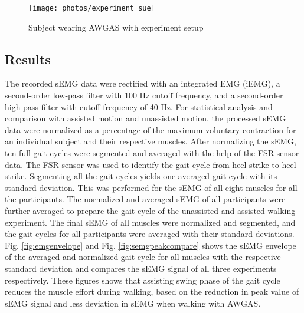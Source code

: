 \documentclass[paper,JRM,paper]{jaciiiarticle}
\begin{document}
\begin{figure}[h]
	\centering
	\texttt{[image: photos/experiment\_sue]}
	\caption{Subject wearing AWGAS with experiment setup}
	\label{fig:experiment}
\end{figure}

\subsection{Results}
The recorded sEMG data were rectified with an integrated EMG (iEMG), a second-order low-pass filter with 100 Hz cutoff frequency, and a second-order high-pass filter with cutoff frequency of 40 Hz. For statistical analysis and comparison with assisted motion and unassisted motion, the processed sEMG data were normalized as a percentage of the maximum voluntary contraction for an individual subject and their respective muscles. After normalizing the sEMG, ten full gait cycles were segmented and averaged with the help of the FSR sensor data. The FSR sensor was used to identify the gait cycle from heel strike to heel strike. Segmenting all the gait cycles yields one averaged gait cycle with its standard deviation. This was performed for the sEMG of all eight muscles for all the participants. The normalized and averaged sEMG of all participants were further averaged to prepare the gait cycle of the unassisted and assisted walking experiment. The final sEMG of all muscles were normalized and segmented, and the gait cycles for all participants were averaged with their standard deviations. Fig. \ref{fig:emgenvelope} and Fig. \ref{fig:semgpeakcompare} shows the sEMG envelope of the averaged and normalized gait cycle for all muscles with the respective standard deviation and compares the sEMG signal of all three experiments respectively. These figures shows that assisting swing phase of the gait cycle reduces the muscle effort during walking, based on the reduction in peak value of sEMG signal and less deviation in sEMG when walking with AWGAS.
\end{document}
